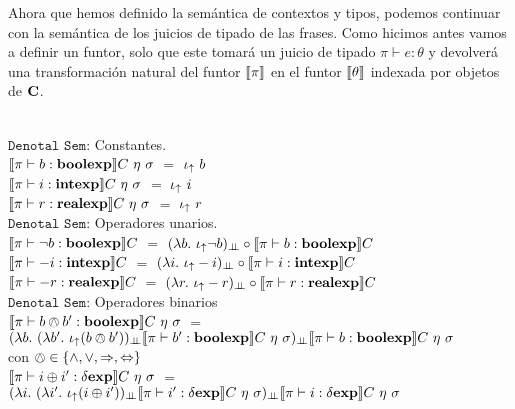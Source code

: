 Ahora que hemos definido la sem\'antica de contextos y tipos, podemos continuar con
la sem\'antica de los juicios de tipado de las frases. Como hicimos antes vamos a definir un 
funtor, solo que este tomar\'a un juicio de tipado $\pi \vdash e : \theta$ y 
devolver\'a una transformaci\'on natural del funtor $\llbracket \pi \rrbracket$ en el funtor $\llbracket \theta \rrbracket$ 
indexada por objetos de $\textbf{C}$.\\
\

\noindent
$\texttt{Denotal Sem:}$ Constantes.\\

$\llbracket  \pi \vdash b : \textbf{boolexp}  \rrbracket C \ \eta \ \sigma$ $=$ $\iota_{\uparrow} \ b$\\

$\llbracket  \pi \vdash i : \textbf{intexp}   \rrbracket C \ \eta \ \sigma$ $=$ $\iota_{\uparrow} \ i$\\

$\llbracket  \pi \vdash r : \textbf{realexp}  \rrbracket C \ \eta \ \sigma$ $=$ $\iota_{\uparrow} \ r$\\

\noindent
$\texttt{Denotal Sem:}$ Operadores unarios.\\

$\llbracket  \pi \vdash \neg b : \textbf{boolexp}  \rrbracket C$ 
$=$ 
$(\lambda b . \ \iota_{\uparrow} \neg b)_{\bot \!\!\! \bot} \circ \llbracket \pi \vdash b : \textbf{boolexp} \rrbracket C$\\

$\llbracket  \pi \vdash -i : \textbf{intexp}  \rrbracket C$ 
$=$ 
$(\lambda i . \ \iota_{\uparrow} -i)_{\bot \!\!\! \bot} \circ \llbracket \pi \vdash i : \textbf{intexp} \rrbracket C$\\

$\llbracket  \pi \vdash -r : \textbf{realexp}  \rrbracket C$ 
$=$ 
$(\lambda r . \ \iota_{\uparrow} -r)_{\bot \!\!\! \bot} \circ \llbracket \pi \vdash r : \textbf{realexp} \rrbracket C$\\

\noindent
$\texttt{Denotal Sem:}$ Operadores binarios\\

$\llbracket  \pi \vdash b \owedge b' : \textbf{boolexp}  \rrbracket C \ \eta \ \sigma$ 
$=$ \\
\indent \indent \indent
$(\lambda b . \ (\lambda b' . \ \iota_{\uparrow} (b \owedge b'))_{\bot \!\!\! \bot}
\llbracket \pi \vdash b' : \textbf{boolexp} \rrbracket C \ \eta \ \sigma)_{\bot \!\!\! \bot}
\llbracket \pi \vdash b : \textbf{boolexp} \rrbracket C \ \eta \ \sigma$\\

con $\owedge \in \{ \wedge,\vee,\Rightarrow,\Leftrightarrow \}$\\

$\llbracket  \pi \vdash i \oplus i' : \delta \textbf{exp}  \rrbracket C \ \eta \ \sigma$ 
$=$ \\
\indent \indent \indent
$(\lambda i . \ (\lambda i' . \ \iota_{\uparrow} (i \oplus i'))_{\bot \!\!\! \bot}
\llbracket \pi \vdash i' : \delta \textbf{exp} \rrbracket C \ \eta \ \sigma)_{\bot \!\!\! \bot}
\llbracket \pi \vdash i : \delta \textbf{exp} \rrbracket C \ \eta \ \sigma$\\

